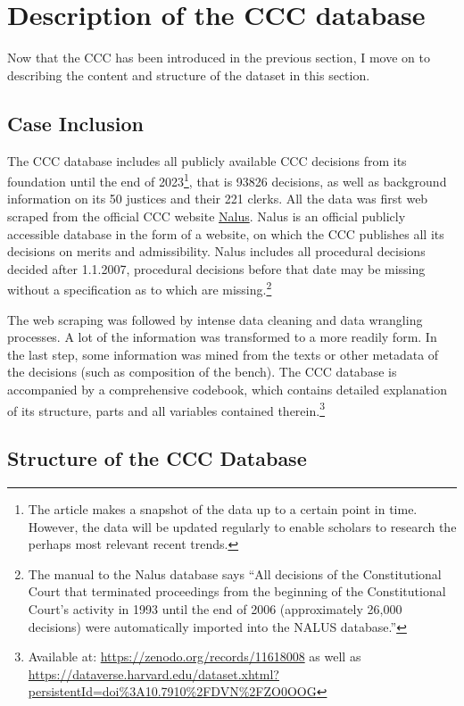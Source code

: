 \documentclass[
  11pt,
]{article}
\begin{document}
\section{Description of the CCC database}\label{database}

Now that the CCC has been introduced in the previous section, I move on to describing the content and structure of the dataset in this section.

\subsection{Case Inclusion}\label{case-inclusion}

The CCC database includes all publicly available CCC decisions from its foundation until the end of 2023\footnote{The article makes a snapshot of the data up to a certain point in time. However, the data will be updated regularly to enable scholars to research the perhaps most relevant recent trends.}, that is 93826 decisions, as well as background information on its 50 justices and their 221 clerks. All the data was first web scraped from the official CCC website \href{https://nalus.usoud.cz/Search/Search.aspx}{Nalus}. Nalus is an official publicly accessible database in the form of a website, on which the CCC publishes all its decisions on merits and admissibility. Nalus includes all procedural decisions decided after 1.1.2007, procedural decisions before that date may be missing without a specification as to which are missing.\footnote{The manual to the Nalus database says ``All decisions of the Constitutional Court that terminated proceedings from the beginning of the Constitutional Court's activity in 1993 until the end of 2006 (approximately 26,000 decisions) were automatically imported into the NALUS database.''}

The web scraping was followed by intense data cleaning and data wrangling processes. A lot of the information was transformed to a more readily form. In the last step, some information was mined from the texts or other metadata of the decisions (such as composition of the bench). The CCC database is accompanied by a comprehensive codebook, which contains detailed explanation of its structure, parts and all variables contained therein.\footnote{Available at: \url{https://zenodo.org/records/11618008} as well as \url{https://dataverse.harvard.edu/dataset.xhtml?persistentId=doi\%3A10.7910\%2FDVN\%2FZO0OOG}}

\subsection{Structure of the CCC Database}\label{structure-of-the-ccc-database}
\end{document}
